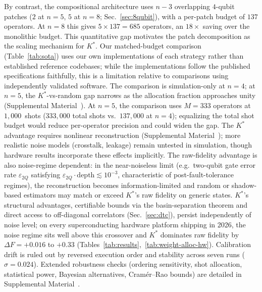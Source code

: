 \documentclass[twocolumn,prx,aps,superscriptaddress,longbibliography,floatfix]{revtex4-2}
\begin{document}
By contrast, the compositional architecture uses $n - 3$
overlapping $4$-qubit patches ($2$ at $n{=}5$, $5$ at $n{=}8$;
Sec.~\ref{sec:8qubit}), with a per-patch budget of $137$
operators.  At $n = 8$ this gives $5 \times 137 = 685$
operators, an $18\times$ saving over the monolithic budget.
This quantitative gap motivates the patch decomposition as the
scaling mechanism for $K^*$.
Our matched-budget comparison (Table~\ref{tab:sota}) uses our own
implementations of each strategy rather than established
reference codebases; while the implementations follow the
published specifications faithfully, this is a limitation
relative to comparisons using independently validated software.
The comparison is simulation-only
at $n = 4$; at $n = 5$, the $K^*$-vs-random gap narrows as the
allocation fraction approaches unity
(Supplemental Material~\cite{supplemental}).  At $n = 5$, the comparison uses
$M = 333$ operators at $1{,}000$~shots ($333{,}000$ total shots
vs.\ $137{,}000$ at $n = 4$); equalizing the total shot budget
would reduce per-operator precision and could widen the gap.
The $K^*$ advantage requires nonlinear reconstruction
(Supplemental Material~\cite{supplemental}); more realistic noise models
(crosstalk, leakage) remain untested in simulation, though
hardware results incorporate these effects implicitly.
The raw-fidelity advantage is also noise-regime dependent:
in the near-noiseless limit (e.g.\ two-qubit gate error rate $\varepsilon_{2Q}$ satisfying
$\varepsilon_{2Q}\!\cdot\!\text{depth}
\lesssim 10^{-3}$, characteristic of post-fault-tolerance regimes),
the reconstruction becomes information-limited and
random or shadow-based estimators may match or exceed
$K^*$'s raw fidelity on generic states.
$K^*$'s structural advantages, certifiable bounds via the
basin-separation theorem and direct access to off-diagonal
correlators (Sec.~\ref{sec:dtc}), persist independently of
noise level; on every superconducting hardware platform shipping
in 2026, the noise regime sits well above this crossover and
$K^*$ dominates raw fidelity by $\Delta F = +0.016$ to $+0.33$
(Tables~\ref{tab:results},~\ref{tab:weight-alloc-hw}).
Calibration drift is ruled out by reversed execution order and
stability across seven runs ($\sigma = 0.024$).
Extended robustness checks (ordering sensitivity,
shot allocation, statistical power, Bayesian alternatives,
Cram\'{e}r--Rao bounds) are detailed in
Supplemental Material~\cite{supplemental}.
\end{document}
